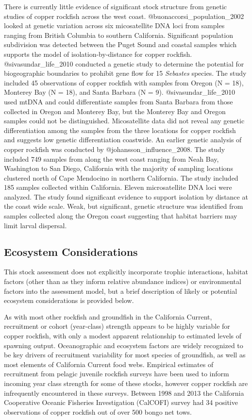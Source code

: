 \documentclass[11pt,
  letterpaper,
]{article}
\begin{document}
There is currently little evidence of significant stock structure from genetic studies of copper rockfish across the west coast. @buonaccorsi\_population\_2002 looked at genetic variation across six micosatellite DNA loci from samples ranging from British Columbia to southern California. Significant population subdivision was detected between the Puget Sound and coastal samples which supports the model of isolation-by-distance for copper rockfish. @sivasundar\_life\_2010 conducted a genetic study to determine the potential for biogeographic boundaries to prohibit gene flow for 15 \emph{Sebastes} species. The study included 45 observations of copper rockfish with samples from Oregon (N = 18), Monterey Bay (N = 18), and Santa Barbara (N = 9). @sivasundar\_life\_2010 used mtDNA and could differentiate samples from Santa Barbara from those collected in Oregon and Monterey Bay, but the Monterey Bay and Oregon samples could not be distinguished. Micosatellite data did not reveal any genetic differentiation among the samples from the three locations for copper rockfish and suggests low genetic differentiation coastwide. An earlier genetic analysis of copper rockfish was conducted by @johansson\_influence\_2008. The study included 749 samples from along the west coast ranging from Neah Bay, Washington to San Diego, California with the majority of sampling locations clustered north of Cape Mendocino in northern California. The study included 185 samples collected within California. Eleven microsatellite DNA loci were analyzed. The study found significant evidence to support isolation by distance at the coast wide scale. Weak, but significant, genetic structure was identified from samples collected along the Oregon coast suggesting that habitat barriers may limit larval dispersal.

\subsection{Ecosystem Considerations}\label{ecosystem-considerations-1}

This stock assessment does not explicitly incorporate trophic interactions, habitat factors (other than as they inform relative abundance indices) or environmental factors into the assessment model, but a brief description of likely or potential ecosystem considerations is provided below.

As with most other rockfish and groundfish in the California Current, recruitment or cohort (year-class) strength appears to be highly variable for copper rockfish, with only a modest apparent relationship to estimated levels of spawning output. Oceanographic and ecosystem factors are widely recognized to be key drivers of recruitment variability for most species of groundfish, as well as most elements of California Current food webs. Empirical estimates of recruitment from pelagic juvenile rockfish surveys have been used to inform incoming year class strength for some of these stocks, however copper rockfish are infrequently encountered in these surveys. Between 1998 and 2013 the California Cooperative Oceanic Fisheries Investigation (CalCOFI) survey had 34 positive observations of copper rockfish out of over 500 bongo net tows.
\end{document}
